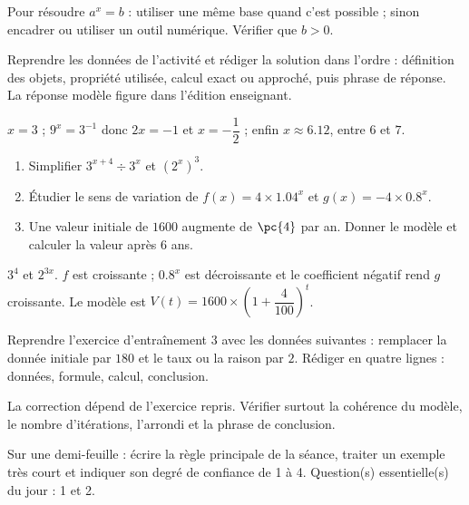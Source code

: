 \begin{summary}Pour résoudre $a^x=b$ : utiliser une même base quand c'est possible ; sinon encadrer ou utiliser un outil numérique. Vérifier que $b>0$.\end{summary}

\begin{example}
Reprendre les données de l'activité et rédiger la solution dans l'ordre : définition des objets, propriété utilisée, calcul exact ou approché, puis phrase de réponse. La réponse modèle figure dans l'édition enseignant.
\end{example}
\begin{solution}$x=3$ ; $9^x=3^{-1}$ donc $2x=-1$ et $x=-\dfrac12$ ; enfin $x\approx\num{6,12}$, entre $6$ et $7$.\end{solution}

\begin{exercise}[essentiel]
\begin{enumerate}\item Simplifier $3^{x+4}\div3^x$ et $(2^x)^3$.\item Étudier le sens de variation de $f(x)=4\times\num{1,04}^x$ et $g(x)=-4\times\num{0,8}^x$.\item Une valeur initiale de $1600$ augmente de $\pc{4}$ par an. Donner le modèle et calculer la valeur après $6$ ans.\end{enumerate}
\end{exercise}
\begin{solution}$3^4$ et $2^{3x}$. $f$ est croissante ; $\num{0,8}^x$ est décroissante et le coefficient négatif rend $g$ croissante. Le modèle est $V(t)=1600\times\left(1+\dfrac{4}{100}\right)^t$.\end{solution}


\begin{homework}Reprendre l'exercice d'entraînement 3 avec les données suivantes : remplacer la donnée initiale par $180$ et le taux ou la raison par $2$. Rédiger en quatre lignes : données, formule, calcul, conclusion.\end{homework}
\begin{solution}La correction dépend de l'exercice repris. Vérifier surtout la cohérence du modèle, le nombre d'itérations, l'arrondi et la phrase de conclusion.\end{solution}

\begin{exitticket}[3 minutes]Sur une demi-feuille : écrire la règle principale de la séance, traiter un exemple très court et indiquer son degré de confiance de 1 à 4. Question(s) essentielle(s) du jour : 1 et 2.\end{exitticket}

